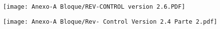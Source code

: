     \begin{landscape}
        \begin{sidewaysfigure}
            \centering
            \texttt{[image: Anexo-A Bloque/REV-CONTROL version 2.6.PDF]}
            \label{fig:A_1}
        \end{sidewaysfigure}
        
        \newpage
        
        \begin{sidewaysfigure}
            \centering
            \texttt{[image: Anexo-A Bloque/Rev- Control Version 2.4 Parte 2.pdf]}
            \label{fig:A_2}
        \end{sidewaysfigure}
        
    \end{landscape}